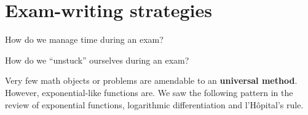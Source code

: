 \documentclass[../main.tex]{subfiles}
\begin{document}
 \section{Exam-writing strategies}
\faComment{} How do we manage time during an exam?

\clearpage

\faComment{} How do we ``unstuck'' ourselves during an exam?

\clearpage


\clearpage
Very few math objects or problems are amendable to an \textbf{universal method}. However, exponential-like functions are. We saw the following pattern in the review of exponential functions, logarithmic differentiation and l'H\^opital's rule.
\end{document}
